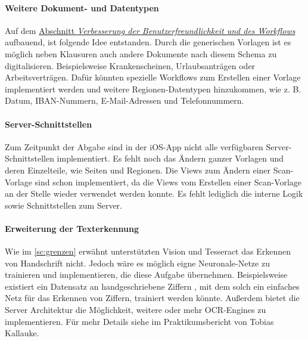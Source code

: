 \documentclass[notables, nomenclature, oneside, 150]{HSMW-Thesis}
\begin{document}
	\paragraph*{Weitere Dokument- und Datentypen} 
		Auf dem \hyperref[pa:benutzer]{Abschnitt \textit{Verbesserung der Benutzerfreundlichkeit und des Workflows}} \xspace aufbauend, ist folgende Idee entstanden. Durch die generischen Vorlagen ist es möglich neben Klausuren auch andere Dokumente nach diesem Schema zu digitalisieren. Beispielsweise Krankenscheinen, Urlaubsanträgen oder Arbeitsverträgen. Dafür könnten spezielle Workflows zum Erstellen einer Vorlage implementiert werden und weitere Regionen-Datentypen hinzukommen, wie z. B. Datum, IBAN-Nummern, E-Mail-Adressen und Telefonnummern.
		
	
	\paragraph*{Server-Schnittstellen} 
		Zum Zeitpunkt der Abgabe sind in der iOS-App nicht alle verfügbaren Server-Schnittstellen implementiert. Es fehlt noch das Ändern ganzer Vorlagen und deren Einzelteile, wie Seiten und Regionen. Die Views zum Ändern einer Scan-Vorlage sind schon implementiert, da die Views vom Erstellen einer Scan-Vorlage an der Stelle wieder verwendet werden konnte. Es fehlt lediglich die interne Logik sowie Schnittstellen zum Server.	
	
	\paragraph*{Erweiterung der Texterkennung} 
		Wie im \autoref{sc:grenzen} erwähnt unterstützten Vision und Tesseract das Erkennen von Handschrift nicht. Jedoch wäre es möglich eigne Neuronale-Netze zu trainieren und implementieren, die diese Aufgabe übernehmen. Beispielsweise existiert ein Datensatz an handgeschriebene Ziffern , mit dem solch ein einfaches Netz für das Erkennen von Ziffern, trainiert werden könnte. Außerdem bietet die Server Architektur die Möglichkeit, weitere oder mehr OCR-Engines zu implementieren. Für mehr Details siehe im Praktikumsbericht von Tobias Kallauke.
	
\end{document}
